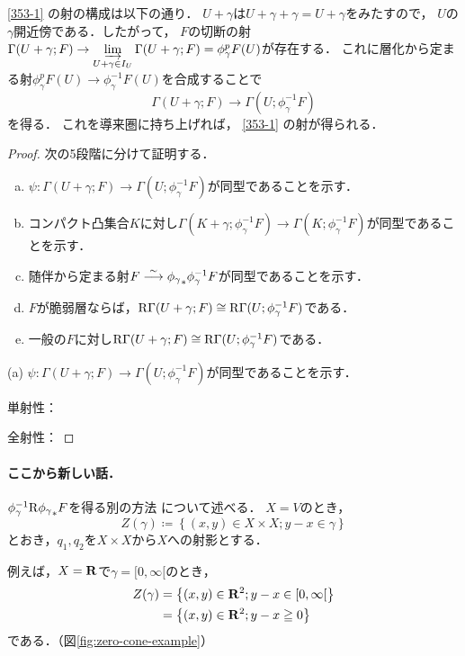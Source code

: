 \eqref{353-1} の射の構成は以下の通り．
\(U+\gamma\)は\(U+\gamma+\gamma=U+\gamma\)をみたすので，
\(U\)の\(\gamma\)開近傍である．したがって，
\(F\)の切断の射\(
    \Gamma(U+\gamma;F)
    \to \indlim[U+\gamma\in I_U]\Gamma(U+\gamma;F)
    = \phi_\gamma^{p}F(U)
\)が存在する．
これに層化から定まる射\(
    \phi_\gamma^{p}F(U)\to\phi_\gamma^{-1}F(U)
\)を合成することで
\[
    \Gamma(U+\gamma;F)\to \Gamma(U;\phi_\gamma^{-1}F)
\]
を得る．
これを導来圏に持ち上げれば，
\eqref{353-1} の射が得られる．
\begin{proof}
    次の5段階に分けて証明する．
    \begin{enumerate}[(a)]
        \item \(\psi\colon \Gamma(U+\gamma;F)\to \Gamma(U;\phi_\gamma^{-1}F)\)が同型であることを示す．
        \item コンパクト凸集合\(K\)に対し\(\Gamma(K+\gamma;\phi_\gamma^{-1}F)\to \Gamma(K;\phi_\gamma^{-1}F)\)が同型であることを示す．
        \item 随伴から定まる射\(F\simarr {\phi_\gamma}_\ast\phi_\gamma^{-1}F\)が同型であることを示す．
        \item \(F\)が脆弱層ならば，\(\RG(U+\gamma;F)\cong\RG(U;\phi_\gamma^{-1}F)\)である．
        \item 一般の\(F\)に対し\(\RG(U+\gamma;F)\cong\RG(U;\phi_\gamma^{-1}F)\)である．
    \end{enumerate}
    
    (a) 
    \(\psi\colon \Gamma(U+\gamma;F)\to \Gamma(U;\phi_\gamma^{-1}F)\)が同型であることを示す．
    
    単射性：
    
    全射性：
\end{proof}

\paragraph{ここから新しい話．}

\(\phi^{-1}_\gamma{\Rder\phi_\gamma}_\ast{F}\)を得る別の方法
について述べる．
\(X=V\)のとき，
\begin{equation}
    Z(\gamma)\coloneqq\left\{
        (x,y)\in X\times X;y-x\in\gamma
    \right\}
\end{equation}
とおき，\(q_1,q_2\)を\(X\times X\)から\(X\)への射影とする．

例えば，\(X=\rr\)で\(\gamma={[}0,\infty{[}\)のとき，
\begin{align*}
    Z(\gamma)
    &=\left\{(x,y)\in\rr^2;y-x\in[0,\infty[\right\}\\
    &=\left\{(x,y)\in\rr^2;y-x\geqq0\right\}
\end{align*}
である．（図\ref{fig:zero-cone-example}）

